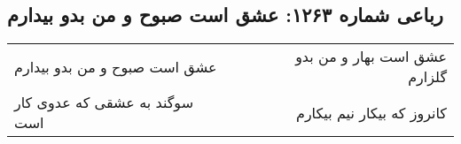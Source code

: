 \begin{center}
\section*{رباعی شماره ۱۲۶۳: عشق است صبوح و من بدو بیدارم}
\label{sec:1263}
\begin{longtable}{l p{0.5cm} r}
عشق است صبوح و من بدو بیدارم
&&
عشق است بهار و من بدو گلزارم
\\
سوگند به عشقی که عدوی کار است
&&
کانروز که بیکار نیم بیکارم
\\
\end{longtable}
\end{center}

